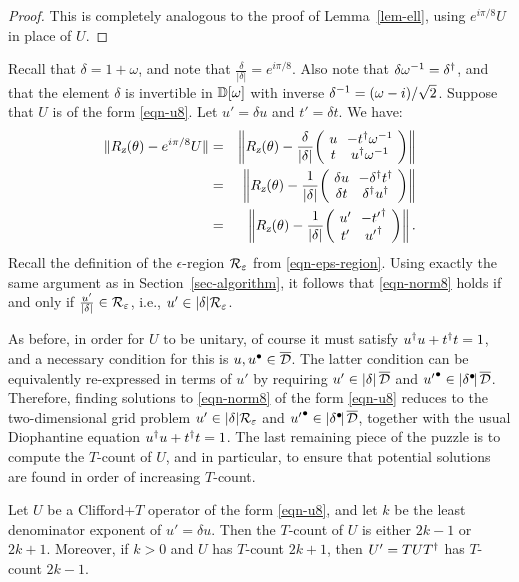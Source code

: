 \documentclass{article}
\begin{document}
\begin{proof}
  This is completely analogous to the proof of Lemma~\ref{lem-ell}, using 
  $e^{i\pi/8}U$ in place of $U$.
\end{proof}

Recall that $\delta = 1+\omega$, and note that
$\frac{\delta}{|\delta|} = e^{i\pi/8}$. Also note that
$\delta\omega^{-1} = \delta^{\dagger}$, and that the element $\delta$ is
invertible in ${\mathbb{D}}[\omega]$ with inverse $\delta^{-1} = (\omega-i)/\sqrt
2$. Suppose that $U$ is of the form {\eqref{eqn-u8}}. Let $u'=\delta
u$ and $t'=\delta t$. We have:
\begin{eqnarray}
  \norm{\Rz(\theta) - e^{i\pi/8}U}
  &=& 
  \bignorm{\Rz(\theta) - \frac{\delta}{|\delta|}\zmatrix{cc}{u &
      -t\da\omega^{-1} \\ t & u\da\omega^{-1}}}
  \nonumber\\ &=&
  \bignorm{\Rz(\theta) - \frac{1}{|\delta|}\zmatrix{cc}{\delta u &
      -\delta\da t\da \\ \delta t & \delta\da u\da}}
  \nonumber\\ &=&
  \bignorm{\Rz(\theta) - \frac{1}{|\delta|}\zmatrix{cc}{u' &
      -{t'}\da \\ t' & {u'}\da}}.
  \nonumber
\end{eqnarray}
Recall the definition of the $\epsilon$-region ${\cal R}_{\varepsilon}$ from
{\eqref{eqn-eps-region}}.  Using exactly the same argument as in
Section~\ref{sec-algorithm}, it follows that {\eqref{eqn-norm8}} holds
if and only if $\frac{u'}{|\delta|}\in{\cal R}_{\varepsilon}$, i.e., $u'\in
|\delta|{\cal R}_{\varepsilon}$.

As before, in order for $U$ to be unitary, of course it must satisfy
$u^{\dagger} u+t^{\dagger} t=1$, and a necessary condition for this is
$u,u^{\bullet}\in\overline {\cal D}$. The latter condition can be equivalently
re-expressed in terms of $u'$ by requiring $u'\in|\delta|\,\overline {\cal D}$ and
${u'}^{\bullet}\in|\delta^{\bullet}\!|\,\overline {\cal D}$. Therefore, finding solutions to
{\eqref{eqn-norm8}} of the form {\eqref{eqn-u8}} reduces to the
two-dimensional grid problem $u'\in |\delta|{\cal R}_{\varepsilon}$ and
${u'}^{\bullet}\in|\delta^{\bullet}\!|\,\overline {\cal D}$, together with the usual
Diophantine equation $u^{\dagger} u+t^{\dagger} t=1$. The last remaining piece of
the puzzle is to compute the $T$-count of $U$, and in particular, to
ensure that potential solutions are found in order of increasing
$T$-count.

\begin{lemma}\label{lem-2k-1}
  Let $U$ be a Clifford+$T$ operator of the form {\eqref{eqn-u8}}, and
  let $k$ be the least denominator exponent of $u'= \delta u$. Then
  the $T$-count of $U$ is either $2k-1$ or $2k+1$. Moreover, if $k>0$
  and $U$ has $T$-count $2k+1$, then $U'=TUT^{\dagger}$ has $T$-count
  $2k-1$. 
\end{lemma}
\end{document}
